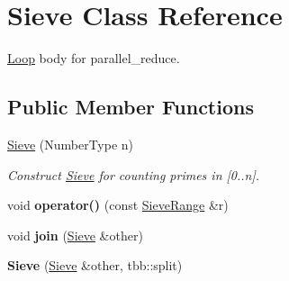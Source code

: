 \hypertarget{classSieve}{}\section{Sieve Class Reference}
\label{classSieve}


\hyperlink{classLoop}{Loop} body for parallel\+\_\+reduce.  


\subsection*{Public Member Functions}
\begin{DoxyCompactItemize}
\item 
\hypertarget{classSieve_aa3350c49b522d095c7cfddc5244e16a2}{}\hyperlink{classSieve_aa3350c49b522d095c7cfddc5244e16a2}{Sieve} (Number\+Type n)\label{classSieve_aa3350c49b522d095c7cfddc5244e16a2}

\begin{DoxyCompactList}\small\item\em Construct \hyperlink{classSieve}{Sieve} for counting primes in \mbox{[}0..n\mbox{]}. \end{DoxyCompactList}\item 
\hypertarget{classSieve_ac3ee6e689aa13afda2bcaf64fdbf2a84}{}void {\bfseries operator()} (const \hyperlink{classSieveRange}{Sieve\+Range} \&r)\label{classSieve_ac3ee6e689aa13afda2bcaf64fdbf2a84}

\item 
\hypertarget{classSieve_af57d0fe767f8df6027ffc68afbf78683}{}void {\bfseries join} (\hyperlink{classSieve}{Sieve} \&other)\label{classSieve_af57d0fe767f8df6027ffc68afbf78683}

\item 
\hypertarget{classSieve_a2d6489ad2b2d8edd2dc477e2b830f3d1}{}{\bfseries Sieve} (\hyperlink{classSieve}{Sieve} \&other, tbb\+::split)\label{classSieve_a2d6489ad2b2d8edd2dc477e2b830f3d1}

\end{DoxyCompactItemize}
